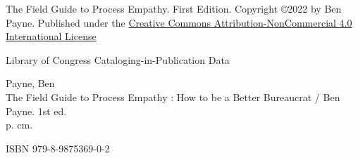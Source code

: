 \thispagestyle{empty}

The Field Guide to Process Empathy. First Edition. Copyright \copyright 2022 by Ben Payne. 
Published under the 
\href{https://creativecommons.org/licenses/by-nc/4.0/}{Creative Commons Attribution-NonCommercial 4.0 International License}


\vspace*{\fill}



Library of Congress Cataloging-in-Publication Data

Payne, Ben\\
The Field Guide to Process Empathy : How to be a Better Bureaucrat / Ben Payne. 1st ed.\\
p. cm.

ISBN 979-8-9875369-0-2
